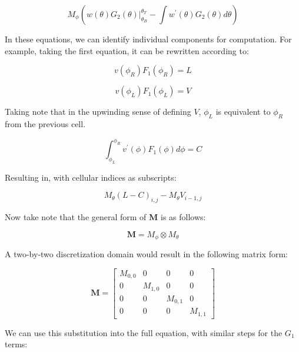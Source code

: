 \documentclass[12pt,a4paper,pagesize=pdftex]{scrartcl}
\begin{document}
\begin{equation*}
    M_\phi \left(w\left(\theta\right)G_2\left(\theta\right)\rvert_{\theta_B}^{\theta_T} - \int w^\prime\left(\theta\right) G_2\left(\theta\right) d\theta\right)
\end{equation*}

In these equations, we can identify individual components for computation. For example, taking the first equation, it can be rewritten according to:

\begin{equation*}
    v\left(\phi_R\right)F_1\left(\phi_R\right) = L
\end{equation*}

\begin{equation*}
    v\left(\phi_L\right)F_1\left(\phi_L\right) = V
\end{equation*}

Taking note that in the upwinding sense of defining \(V\), \(\phi_L\) is equivalent to \(\phi_R\) from the previous cell.

\begin{equation*}
    \int_{\phi_L}^{\phi_R} v^\prime\left(\phi\right) F_1\left(\phi\right) d\phi = C
\end{equation*}

Resulting in, with cellular indices as subscripts:

\begin{equation*}
    M_\theta \left(L - C\right)_{i,j} - M_\theta V_{i-1,j}
\end{equation*}

Now take note that the general form of \(\mathbf{M}\) is as follows:

\begin{equation*}
    \mathbf{M} = M_\phi \otimes M_\theta
\end{equation*}

A two-by-two discretization domain would result in the following matrix form:

\begin{equation*}
    \mathbf{M} =
    \begin{bmatrix}
        M_{0,0} & 0 & 0 & 0 \\
        0 & M_{1,0} & 0 & 0 \\
        0 & 0 & M_{0,1} & 0 \\
        0 & 0 & 0 & M_{1,1}
    \end{bmatrix}
\end{equation*}

We can use this substitution into the full equation, with similar steps for the \(G_1\) terms:
\end{document}
